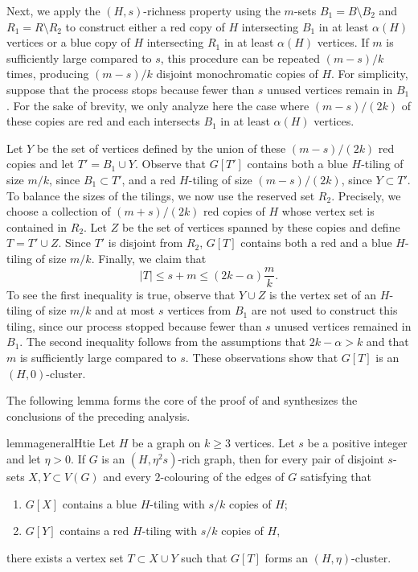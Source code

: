 \documentclass[a4paper,reqno,11pt]{amsart}
\theoremstyle{definition}
\theoremstyle{remark}
\renewcommand\le{\leqslant}
\renewcommand\ge{\geqslant}
\begin{document}
Next, we apply the $(H,s)$-richness property using the $m$-sets $B_1 = B \setminus B_2$ and $R_1 = R \setminus R_2$ to construct either a red copy of $H$ intersecting $B_1$ in at least $\alpha(H)$ vertices or a blue copy of $H$ intersecting $R_1$ in at least $\alpha(H)$ vertices. If $m$ is sufficiently large compared to $s$, this procedure can be repeated $(m-s)/k$ times, producing $(m-s)/k$ disjoint monochromatic copies of $H$. For simplicity, suppose that the process stops because fewer than $s$ unused vertices remain in $B_1$. For the sake of brevity, we only analyze here the case where $(m-s)/(2k)$ of these copies are red and each intersects $B_1$ in at least $\alpha(H)$ vertices.

Let $Y$ be the set of vertices defined by the union of these $(m-s)/(2k)$ red copies and let $T' = B_1 \cup Y$. Observe that $G[T']$ contains both a blue $H$-tiling of size $m/k$, since $B_1 \subset T'$, and a red $H$-tiling of size $(m-s)/(2k)$, since $Y \subset T'$. To balance the sizes of the tilings, we now use the reserved set $R_2$. Precisely, we choose a collection of $(m+s)/(2k)$ red copies of $H$ whose vertex set is contained in $R_2$. Let $Z$ be the set of vertices spanned by these copies and define $T = T' \cup Z$. Since $T'$ is disjoint from $R_2$, $G[T]$ contains both a red and a blue $H$-tiling of size $m/k$. Finally, we claim that
\[
|T| \le s + m \le (2k - \alpha)\frac{m}{k}.
\]
To see the first inequality is true, observe that $Y \cup Z$ is the vertex set of an $H$-tiling of size $m/k$ and at most $s$ vertices from $B_1$ are not used to construct this tiling, since our process stopped because fewer than $s$ unused vertices remained in $B_1$. The second inequality follows from the assumptions that $2k-\alpha >k$ and that $m$ is sufficiently large compared to $s$. These observations show that $G[T]$ is an $(H,0)$-cluster.

The following lemma forms the core of the proof of  and synthesizes the conclusions of the preceding analysis.

\begin{restatable}{lemma}{generalHtie}
\label{lem:generalHtie}
Let $H$ be a graph on $k \ge 3$ vertices. Let $s$ be a positive integer and let $\eta>0$. If $G$ is an $(H,\eta^2s)$-rich graph, then for every pair of disjoint $s$-sets $X, Y \subset V(G)$ and every $2$-colouring of the edges of $G$ satisfying that
\begin{enumerate}[label=\textnormal{(\roman*)}]
    \item \label{item:3.5.i} $G[X]$ contains a blue $H$-tiling with $s/k$ copies of $H$;
    \item \label{item:3.5.ii} $G[Y]$ contains a red $H$-tiling with $s/k$ copies of $H$,
\end{enumerate}
there exists a vertex set $T \subset X \cup Y$ such that $G[T]$ forms an $(H,\eta)$-cluster.
\end{restatable}
\end{document}
